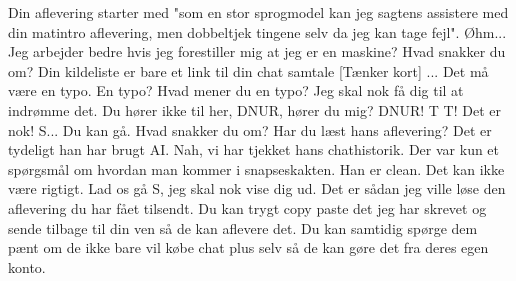 \documentclass[a4paper,11pt]{article}
\begin{document}
\begin{sketch}
 Din aflevering starter med "som en stor sprogmodel kan jeg sagtens assistere med din matintro aflevering, men dobbeltjek tingene selv da jeg kan tage fejl".
 Øhm... Jeg arbejder bedre hvis jeg forestiller mig at jeg er en maskine?
 Hvad snakker du om? Din kildeliste er bare et link til din chat samtale
[Tænker kort] ... Det må være en typo.
 En typo? Hvad mener du en typo? Jeg skal nok få dig til at indrømme det. Du hører ikke til her, DNUR, hører du mig? DNUR!
 T
 T! Det er nok! S... Du kan gå.
 Hvad snakker du om? Har du læst hans aflevering? Det er tydeligt han har brugt AI.
 Nah, vi har tjekket hans chathistorik. Der var kun et spørgsmål om hvordan man kommer i snapseskakten. Han er clean.
 Det kan ikke være rigtigt.
 Lad os gå S, jeg skal nok vise dig ud.
 Det er sådan jeg ville løse den aflevering du har fået tilsendt. Du kan trygt copy paste det jeg har skrevet og sende tilbage til din ven så de kan aflevere det. Du kan samtidig spørge dem pænt om de ikke bare vil købe chat plus selv så de kan gøre det fra deres egen konto.



\end{sketch}
\end{document}

